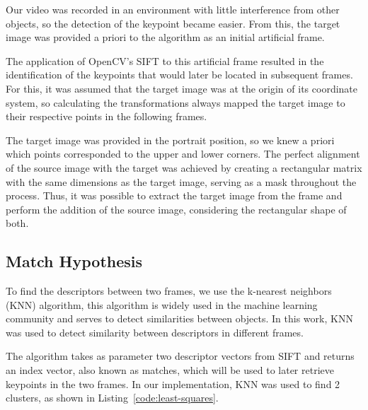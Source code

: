 \documentclass[]{IEEEtran}
\begin{document}
Our video was recorded in an environment with little interference from other objects, so the detection of the keypoint became easier. From this, the target image was provided a priori to the algorithm as an initial artificial frame.

The application of OpenCV's SIFT to this artificial frame resulted in the identification of the keypoints that would later be located in subsequent frames. For this, it was assumed that the target image was at the origin of its coordinate system, so calculating the transformations always mapped the target image to their respective points in the following frames.

The target image was provided in the portrait position, so we knew a priori which points corresponded to the upper and lower corners. The perfect alignment of the source image with the target was achieved by creating a rectangular matrix with the same dimensions as the target image, serving as a mask throughout the process. Thus, it was possible to extract the target image from the frame and perform the addition of the source image, considering the rectangular shape of both.


\subsection{Match Hypothesis}

To find the descriptors between two frames, we use the k-nearest neighbors (KNN) algorithm, this algorithm is widely used in the machine learning community and serves to detect similarities between objects. In this work, KNN was used to detect similarity between descriptors in different frames.

The algorithm takes as parameter two descriptor vectors from SIFT and returns an index vector, also known as matches, which will be used to later retrieve keypoints in the two frames. In our implementation, KNN was used to find 2 clusters, as shown in Listing~\ref{code:least-squares}.
\end{document}
